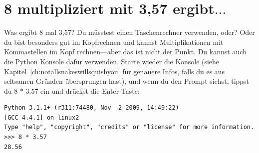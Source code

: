 

\chapter{8 multipliziert mit 3,57 ergibt\texorpdfstring{$\ldots$}{...}}\label{ch:8multipliedby3.57}

Was ergibt 8 mal 3,57?  Du müsstest einen Taschenrechner verwenden, oder? Oder du bist besonders gut im Kopfrechnen und kannst Multiplikationen mit Kommastellen im Kopf rechnen---aber das ist nicht der Punkt. Du kannst auch die Python Konsole dafür verwenden. Starte wieder die Konsole (siehe Kapitel~\ref{ch:notallsnakeswillsquishyou} für genauere Infos, falls du es aus seltsamen Gründen übersprungen hast), und wenn du den Prompt siehst, tippst du 8 $*$ 3.57 ein und drückst die Enter-Taste:


\begin{Verbatim}[frame=single]
Python 3.1.1+ (r311:74480, Nov  2 2009, 14:49:22)
[GCC 4.4.1] on linux2
Type "help", "copyright", "credits" or "license" for more information.
>>> 8 * 3.57
28.56
\end{Verbatim}

